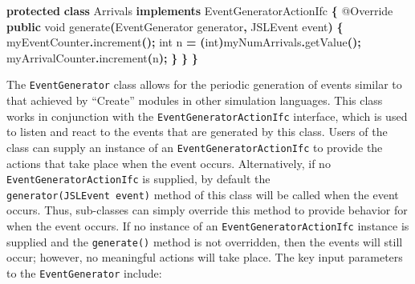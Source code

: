 \documentclass[
]{book}
\newenvironment{Shaded}{\begin{snugshade}}{\end{snugshade}}
\newcommand{\AttributeTok}[1]{\textcolor[rgb]{0.77,0.63,0.00}{#1}}
\newcommand{\DataTypeTok}[1]{\textcolor[rgb]{0.13,0.29,0.53}{#1}}
\newcommand{\FunctionTok}[1]{\textcolor[rgb]{0.00,0.00,0.00}{#1}}
\newcommand{\KeywordTok}[1]{\textcolor[rgb]{0.13,0.29,0.53}{\textbf{#1}}}
\newcommand{\NormalTok}[1]{#1}
\newcommand{\OperatorTok}[1]{\textcolor[rgb]{0.81,0.36,0.00}{\textbf{#1}}}
\theoremstyle{definition}
\theoremstyle{definition}
\theoremstyle{definition}
\theoremstyle{definition}
\theoremstyle{remark}
\begin{document}
\begin{Shaded}
\begin{Highlighting}[]
    \KeywordTok{protected} \KeywordTok{class}\NormalTok{ Arrivals }\KeywordTok{implements}\NormalTok{ EventGeneratorActionIfc }\OperatorTok{\{}
        \AttributeTok{@Override}
        \KeywordTok{public} \DataTypeTok{void} \FunctionTok{generate}\OperatorTok{(}\NormalTok{EventGenerator generator}\OperatorTok{,}\NormalTok{ JSLEvent event}\OperatorTok{)} \OperatorTok{\{}
\NormalTok{            myEventCounter}\OperatorTok{.}\FunctionTok{increment}\OperatorTok{();}
            \DataTypeTok{int}\NormalTok{ n }\OperatorTok{=} \OperatorTok{(}\DataTypeTok{int}\OperatorTok{)}\NormalTok{myNumArrivals}\OperatorTok{.}\FunctionTok{getValue}\OperatorTok{();}
\NormalTok{            myArrivalCounter}\OperatorTok{.}\FunctionTok{increment}\OperatorTok{(}\NormalTok{n}\OperatorTok{);}
        \OperatorTok{\}}
    \OperatorTok{\}}
\OperatorTok{\}}
\end{Highlighting}
\end{Shaded}

The \texttt{EventGenerator} class allows for the periodic generation of events
similar to that achieved by ``Create'' modules in other simulation languages.
This class works in conjunction with the \texttt{EventGeneratorActionIfc}
interface, which is used to listen and react to the events that are
generated by this class. Users of the class can supply an instance of an
\texttt{EventGeneratorActionIfc} to provide the actions that take place when
the event occurs. Alternatively, if no \texttt{EventGeneratorActionIfc} is
supplied, by default the \texttt{generator(JSLEvent\ event)} method of this class
will be called when the event occurs. Thus, sub-classes can simply
override this method to provide behavior for when the event occurs. If
no instance of an \texttt{EventGeneratorActionIfc} instance is supplied and the
\texttt{generate()} method is not overridden, then the events will still occur;
however, no meaningful actions will take place. The key input parameters
to the \texttt{EventGenerator} include:
\end{document}
